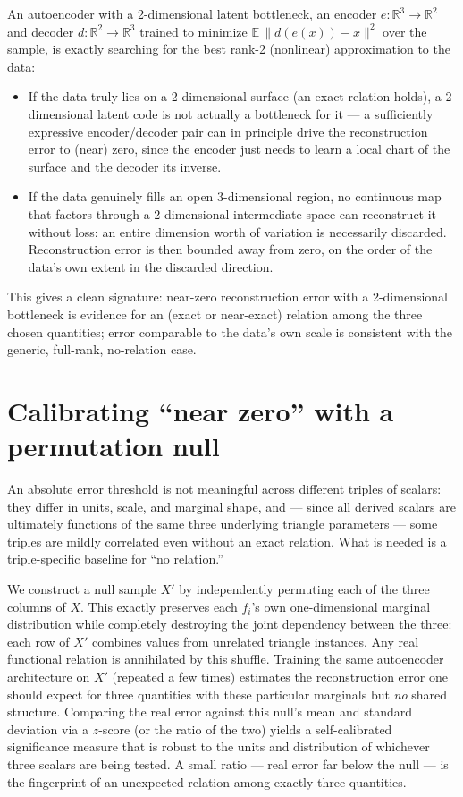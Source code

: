 \documentclass[11pt]{article}
\begin{document}
An autoencoder with a 2-dimensional latent bottleneck, an encoder
$e : \mathbb{R}^3 \to \mathbb{R}^2$ and decoder $d : \mathbb{R}^2 \to
\mathbb{R}^3$ trained to minimize $\mathbb{E}\, \| d(e(x)) - x \|^2$ over the
sample, is exactly searching for the best rank-2 (nonlinear) approximation to
the data:
\begin{itemize}
  \item If the data truly lies on a 2-dimensional surface (an exact relation
    holds), a 2-dimensional latent code is not actually a bottleneck for it —
    a sufficiently expressive encoder/decoder pair can in principle drive the
    reconstruction error to (near) zero, since the encoder just needs to
    learn a local chart of the surface and the decoder its inverse.
  \item If the data genuinely fills an open 3-dimensional region, no
    continuous map that factors through a 2-dimensional intermediate space
    can reconstruct it without loss: an entire dimension worth of variation
    is necessarily discarded. Reconstruction error is then bounded away from
    zero, on the order of the data's own extent in the discarded direction.
\end{itemize}

This gives a clean signature: near-zero reconstruction error with a
2-dimensional bottleneck is evidence for an (exact or near-exact) relation
among the three chosen quantities; error comparable to the data's own scale
is consistent with the generic, full-rank, no-relation case.

\section{Calibrating ``near zero'' with a permutation null}

An absolute error threshold is not meaningful across different triples of
scalars: they differ in units, scale, and marginal shape, and — since all
derived scalars are ultimately functions of the same three underlying
triangle parameters — some triples are mildly correlated even without an
exact relation. What is needed is a triple-specific baseline for ``no
relation.''

We construct a null sample $X'$ by independently permuting each of the three
columns of $X$. This exactly preserves each $f_i$'s own one-dimensional
marginal distribution while completely destroying the joint dependency
between the three: each row of $X'$ combines values from unrelated triangle
instances. Any real functional relation is annihilated by this shuffle.
Training the same autoencoder architecture on $X'$ (repeated a few times)
estimates the reconstruction error one should expect for three quantities
with these particular marginals but \emph{no} shared structure. Comparing the
real error against this null's mean and standard deviation via a $z$-score
(or the ratio of the two) yields a self-calibrated significance measure that
is robust to the units and distribution of whichever three scalars are being
tested. A small ratio — real error far below the null — is the fingerprint
of an unexpected relation among exactly three quantities.
\end{document}
